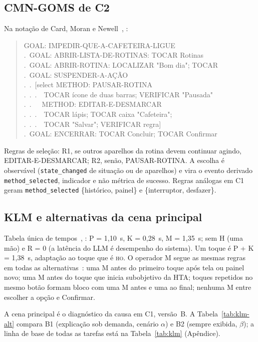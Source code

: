 \documentclass[conference]{IEEEtran}
\newcommand{\stHO}{\textsc{ho}}
\newcommand{\ev}[1]{\texttt{#1}}
\begin{document}
\subsection{CMN-GOMS de C2}
Na notação de Card, Moran e Newell~\cite{barbosa2010}, \cite[cap.~12]{dix2004}:
\begin{quote}\scriptsize\ttfamily
GOAL: IMPEDIR-QUE-A-CAFETEIRA-LIGUE\\
.\ GOAL: ABRIR-LISTA-DE-ROTINAS: TOCAR Rotinas\\
.\ GOAL: ABRIR-ROTINA: LOCALIZAR "Bom dia"; TOCAR\\
.\ GOAL: SUSPENDER-A-AÇÃO\\
.\ .\ [select METHOD: PAUSAR-ROTINA\\
.\ .\ .\ \ TOCAR ícone de duas barras; VERIFICAR "Pausada"\\
.\ .\ \ \ METHOD: EDITAR-E-DESMARCAR\\
.\ .\ .\ \ TOCAR lápis; TOCAR caixa "Cafeteira";\\
.\ .\ .\ \ TOCAR "Salvar"; VERIFICAR regra]\\
.\ GOAL: ENCERRAR: TOCAR Concluir; TOCAR Confirmar
\end{quote}
Regras de seleção: R1, se outros aparelhos da rotina devem continuar agindo, EDITAR-E-DESMARCAR; R2, senão, PAUSAR-ROTINA. A escolha é observável (\ev{state\_changed} de situação ou de aparelhos) e vira o evento derivado \ev{method\_selected}, indicador e não métrica de sucesso. Regras análogas em C1 geram \ev{method\_selected} \{histórico, painel\} e \{interruptor, desfazer\}.

\subsection{KLM e alternativas da cena principal}\label{sec:klm}
Tabela única de tempos~\cite{card1980}, \cite[cap.~12]{dix2004}: P = 1,10~s, K = 0,28~s, M = 1,35~s; sem H (uma mão) e R = 0 (a latência do LLM é desempenho do sistema). Um toque é P + K = 1,38~s, adaptação ao toque que é \stHO. O operador M segue as mesmas regras em todas as alternativas~\cite[pp.~448--456]{preece2002}: uma M antes do primeiro toque após tela ou painel novo; uma M antes do toque que inicia subobjetivo da HTA; toques repetidos no mesmo botão formam bloco com uma M antes e uma ao final; nenhuma M entre escolher a opção e Confirmar.

A cena principal é o diagnóstico da causa em C1, versão~B. A Tabela~\ref{tab:klm-alt} compara B1 (explicação sob demanda, cenário $\alpha$) e B2 (sempre exibida, $\beta$); a linha de base de todas as tarefas está na Tabela~\ref{tab:klm} (Apêndice).
\end{document}
